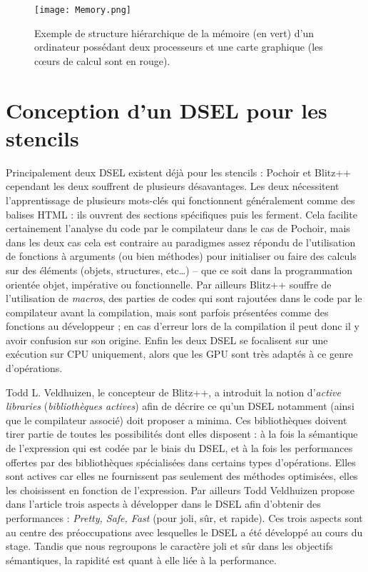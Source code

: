 \begin{figure}[!h]
  \caption{Exemple de structure hiérarchique de la mémoire (en vert) d'un ordinateur possédant deux processeurs et une carte graphique (les cœurs de calcul sont en rouge).}
  \label{fig:memoire_base}
  \texttt{[image: Memory.png]}
\end{figure}


\section{Conception d'un DSEL pour les stencils}

Principalement deux DSEL existent déjà pour les stencils : \textsf{Pochoir} et \textsf{Blitz++} cependant les deux souffrent de plusieurs désavantages. Les deux nécessitent l'apprentissage de plusieurs mots-clés qui fonctionnent généralement comme des balises HTML : ils ouvrent des sections spécifiques puis les ferment. Cela facilite certainement l'analyse du code par le compilateur dans le cas de \textsf{Pochoir}, mais dans les deux cas cela est contraire au paradigmes assez répondu de l'utilisation de fonctions à arguments (ou bien méthodes) pour initialiser ou faire des calculs sur des éléments (objets, structures, etc\ldots) -- que ce soit dans la programmation orientée objet, impérative ou fonctionnelle. Par ailleurs \textsf{Blitz++} souffre de l'utilisation de \emph{macros}, des parties de codes qui sont rajoutées dans le code par le compilateur avant la compilation, mais sont parfois présentées comme des fonctions au développeur ; en cas d'erreur lors de la compilation il peut donc il y avoir confusion sur son origine. Enfin les deux DSEL se focalisent sur une exécution sur CPU uniquement, alors que les GPU sont très adaptés à ce genre d'opérations.

Todd L. Veldhuizen, le concepteur de \textsf{Blitz++}, a introduit la notion d'\emph{active libraries} (\emph{bibliothèques actives}) \cite{Art20} afin de décrire ce qu'un DSEL notamment (ainsi que le compilateur associé) doit proposer a minima. Ces bibliothèques doivent tirer partie de toutes les possibilités dont elles disposent : à la fois la sémantique de l'expression qui est codée par le biais du DSEL, et à la fois les performances offertes par des bibliothèques spécialisées dans certains types d'opérations. Elles sont actives car elles ne fournissent pas seulement des méthodes optimisées, elles les choisissent en fonction de l'expression. Par ailleurs Todd Veldhuizen propose dans l'article \cite{Art22} trois aspects à développer dans le DSEL afin d'obtenir des performances : \emph{Pretty, Safe, Fast} (pour joli, sûr, et rapide). Ces trois aspects sont au centre des préoccupations avec lesquelles le DSEL a été développé au cours du stage. Tandis que nous regroupons le caractère joli et sûr dans les objectifs sémantiques, la rapidité est quant à elle liée à la performance.

